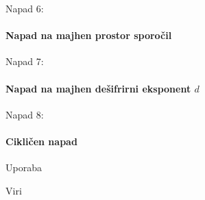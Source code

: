 \documentclass[a4paper, 12pt]{beamer} %
\begin{document}
\begin{frame}{Napad 6:}
\framesubtitle{Napad na majhen prostor sporočil}
\end{frame}

\begin{frame}{Napad 7:}
\framesubtitle{Napad na majhen dešifrirni eksponent $d$}
\end{frame}

\begin{frame}{Napad 8:}
\framesubtitle{Cikličen napad}
\end{frame}

\begin{frame}{Uporaba}
\end{frame}

\begin{frame}{Viri}
\end{frame}
\end{document}
